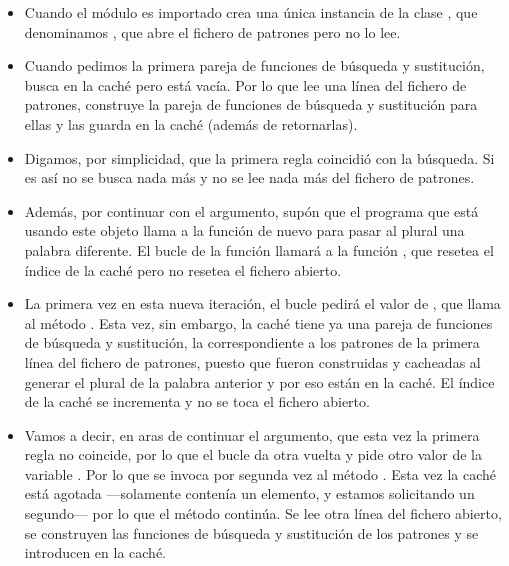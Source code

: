 \begin{itemize}

\item Cuando el módulo es importado crea una única instancia de la clase , que denominamos , que abre el fichero de patrones pero no lo lee.

\item Cuando pedimos la primera pareja de funciones de búsqueda y sustitución, busca en la caché pero está vacía. Por lo que lee una línea del fichero de patrones, construye la pareja de funciones de búsqueda y sustitución para ellas y las guarda en la caché (además de retornarlas).

\item Digamos, por simplicidad, que la primera regla coincidió con la búsqueda. Si es así no se busca nada más y no se lee nada más del fichero de patrones.

\item Además, por continuar con el argumento, supón que el programa que está usando este objeto llama a la función  de nuevo para pasar al plural una palabra diferente. El bucle  de la función  llamará a la función , que resetea el índice de la caché pero no resetea el fichero abierto.

\item La primera vez en esta nueva iteración, el bucle  pedirá el valor de , que llama al método . Esta vez, sin embargo, la caché tiene ya una pareja de funciones de búsqueda y sustitución, la correspondiente a los patrones de la primera línea del fichero de patrones, puesto que fueron construidas y cacheadas al generar el plural de la palabra anterior y por eso están en la caché. El índice de la caché se incrementa y no se toca el fichero abierto.

\item Vamos a decir, en aras de continuar el argumento, que esta vez la primera regla no coincide, por lo que el bucle  da otra vuelta y pide otro valor de la variable . Por lo que se invoca por segunda vez al método . Esta vez la caché está agotada ---solamente contenía un elemento, y estamos solicitando un segundo--- por lo que el método  continúa. Se lee otra línea del fichero abierto, se construyen las funciones de búsqueda y sustitución de los patrones y se introducen en la caché.


\end{itemize}
